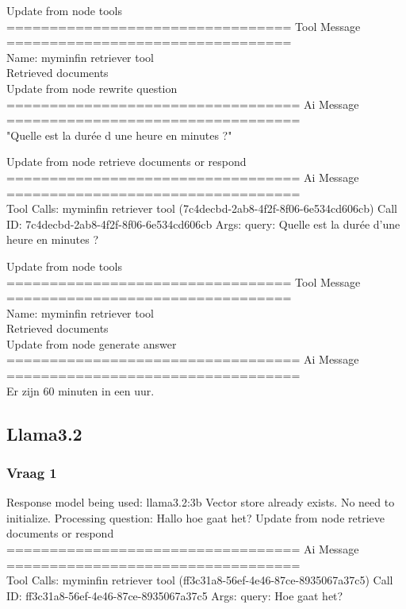 Update from node tools
\\[1em]
================================= Tool Message =================================
\\[1em]
Name: myminfin retriever tool
\\[1em]
Retrieved documents
\\[1em]
Update from node rewrite question
\\[1em]
================================== Ai Message ==================================
\\[1em]
"Quelle est la durée d une heure en minutes ?"

Update from node retrieve documents or respond
\\[1em]
================================== Ai Message ==================================
\\[1em]
Tool Calls:
myminfin retriever tool (7c4decbd-2ab8-4f2f-8f06-6e534cd606cb)
Call ID: 7c4decbd-2ab8-4f2f-8f06-6e534cd606cb
Args:
query: Quelle est la durée d’une heure en minutes ?


Update from node tools
\\[1em]
================================= Tool Message =================================
\\[1em]
Name: myminfin retriever tool
\\[1em]
Retrieved documents
\\[1em]

Update from node generate answer
\\[1em]
================================== Ai Message ==================================
\\[1em]
Er zijn 60 minuten in een uur.



\subsection{Llama3.2}
\subsubsection{Vraag 1}
Response model being used: llama3.2:3b
Vector store already exists. No need to initialize.
Processing question: Hallo hoe gaat het?
Update from node retrieve  documents  or  respond
\\[1em]
================================== Ai Message ==================================
\\[1em]
Tool Calls:
myminfin  retriever  tool (ff3c31a8-56ef-4e46-87ce-8935067a37c5)
Call ID: ff3c31a8-56ef-4e46-87ce-8935067a37c5
Args:
query: Hoe gaat het?



